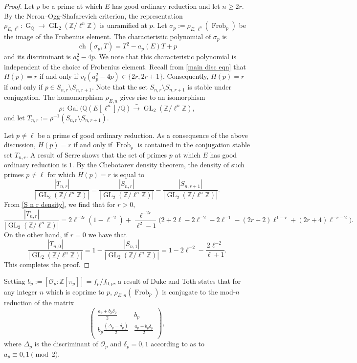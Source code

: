 \documentclass[table]{amsart}
\newcommand{\Z}{\mathbb{Z}}
\newcommand{\Q}{\mathbb{Q}}
\newcommand{\cO}{\mathcal{O}}
\newcommand{\op}[1]{\operatorname{#1}}
\newcommand\mtx[4] { \left( {\begin{array}{cc}
 #1 & #2 \\
 #3 & #4 \\
 \end{array} } \right)}
\numberwithin{equation}{section}
\begin{document}
\begin{proof}
Let $p$ be a prime at which $E$ has good ordinary reduction and let $n\geq 2r$. By the Neron--Ogg-Shafarevich criterion, the representation $\rho_{E, \ell^n}:\op{G}_{\Q}\rightarrow \op{GL}_2(\Z/\ell^n\Z)$ is unramified at $p$. Let $\sigma_p:=\rho_{E, \ell^n}(\op{Frob}_p)$ be the image of the Frobenius element. The characteristic polynomial of $\sigma_p$ is 
    \[\op{ch}(\sigma_p, T)=T^2-a_p(E)T+p\]\noindent and its discriminant is $a_p^2-4p$. We note that this characteristic polynomial is independent of the choice of Frobenius element. Recall from \eqref{main disc eqn} that $H(p)=r$ if and only if $v_\ell(a_p^2-4p)\in \{2r, 2r+1\}$. Consequently, $H(p)=r$ if and only if $p\in S_{n, r}\setminus S_{n, r+1}$. Note that the set $S_{n, r}\setminus S_{n, r+1}$ is stable under conjugation. The homomorphism $\rho_{E,n}$ gives rise to an isomorphism 
    \[\rho:\op{Gal}(\Q(E[\ell^n]/\Q)\xrightarrow{\sim} \op{GL}_2(\Z/\ell^n\Z),\] and let $T_{n,r}:=\rho^{-1}\left(S_{n, r}\setminus S_{n, r+1}\right)$. 
    
    \par Let $p\neq \ell$ be a prime of good ordinary reduction. As a consequence of the above discussion, $H(p)=r$ if and only if $\op{Frob}_p$ is contained in the conjugation stable set $T_{n,r}$.  A result of Serre shows that the set of primes $p$ at which $E$ has good ordinary reduction is $1$. By the Chebotarev density theorem, the density of such primes $p\neq \ell$ for which $H(p)=r$ is equal to \[\frac{|T_{n,r}|}{|\op{GL}_2(\Z/\ell^n\Z)|}=\frac{|S_{n,r}|}{|\op{GL}_2(\Z/\ell^n\Z)|}-\frac{|S_{n,r+1}|}{|\op{GL}_2(\Z/\ell^n\Z)|}.\]
    \noindent From \eqref{S n r density}, we find that for $r>0$,
    \[\frac{|T_{n,r}|}{|\op{GL}_2(\Z/\ell^n\Z)|}=2\ell^{-2r}(1-\ell^{-2})
+
\frac{\ell^{-2r}}{\ell^{2}-1}
\Big(
2+2\ell-2\ell^{-2}-2\ell^{-1}
-(2r+2)\ell^{1-r}
+(2r+4)\ell^{-r-2}
\Big).
\]
On the other hand, if $r=0$ we have that 
\[\frac{|T_{n,0}|}{|\op{GL}_2(\Z/\ell^n\Z)|}=1-\frac{|S_{n,1}|}{|\op{GL}_2(\Z/\ell^n\Z)|}=1-2\ell^{-2}-\frac{2\ell^{-2}}{\ell+1}.
\]
\noindent This completes the proof.
\end{proof}
\par Setting $b_p:=[\cO_p:\Z[\pi_p]]=f_p/f_{0,p}$, a result of Duke and Toth \cite{duketoth} states that for any integer $n$ which is coprime to $p$,
$\rho_{E,n}(\op{Frob}_p)$ is conjugate to the mod-$n$ reduction of the matrix 
\begin{equation}\label{duketoth matrix}\mtx{\frac{a_p+b_p\delta_p}{2}}{b_p}{b_p\frac{(\Delta_p-\delta_p)}{2}}{\frac{a_p-b_p\delta_p}{2}},\end{equation} where $\Delta_p$ is the discriminant of $\cO_p$ and $\delta_p=0,1$ according to as to $a_p\equiv 0,1\pmod{2}$. 
\end{document}
